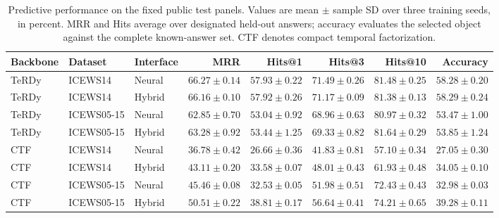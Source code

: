 \begin{table}[tbp]\centering\small\caption{Predictive performance on the fixed public test panels. Values are mean $\pm$ sample SD over three training seeds, in percent. MRR and Hits average over designated held-out answers; accuracy evaluates the selected object against the complete known-answer set. CTF denotes compact temporal factorization.}\label{tab:prediction}\begin{tabular}{lllrrrrr}\toprule Backbone & Dataset & Interface & MRR & Hits@1 & Hits@3 & Hits@10 & Accuracy\\\midrule
TeRDy & ICEWS14 & Neural & $66.27\pm0.14$ & $57.93\pm0.22$ & $71.49\pm0.26$ & $81.48\pm0.25$ & $58.28\pm0.20$\\
TeRDy & ICEWS14 & Hybrid & $66.16\pm0.10$ & $57.92\pm0.26$ & $71.17\pm0.09$ & $81.38\pm0.13$ & $58.29\pm0.24$\\
TeRDy & ICEWS05-15 & Neural & $62.85\pm0.70$ & $53.04\pm0.92$ & $68.96\pm0.63$ & $80.97\pm0.32$ & $53.47\pm1.00$\\
TeRDy & ICEWS05-15 & Hybrid & $63.28\pm0.92$ & $53.44\pm1.25$ & $69.33\pm0.82$ & $81.64\pm0.29$ & $53.85\pm1.24$\\
CTF & ICEWS14 & Neural & $36.78\pm0.42$ & $26.66\pm0.36$ & $41.83\pm0.81$ & $57.10\pm0.34$ & $27.05\pm0.30$\\
CTF & ICEWS14 & Hybrid & $43.11\pm0.20$ & $33.58\pm0.07$ & $48.01\pm0.43$ & $61.93\pm0.48$ & $34.05\pm0.10$\\
CTF & ICEWS05-15 & Neural & $45.46\pm0.08$ & $32.53\pm0.05$ & $51.98\pm0.51$ & $72.43\pm0.43$ & $32.98\pm0.03$\\
CTF & ICEWS05-15 & Hybrid & $50.51\pm0.22$ & $38.81\pm0.17$ & $56.64\pm0.41$ & $74.21\pm0.65$ & $39.28\pm0.11$\\\bottomrule\end{tabular}\end{table}